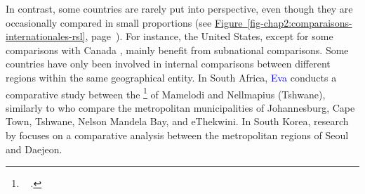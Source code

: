 \begin{refsegment}
In contrast, some countries are rarely put into perspective, even though they are occasionally compared in small proportions (see \hyperref[fig-chap2:comparaisons-internationales-rsl]{Figure~\ref{fig-chap2:comparaisons-internationales-rsl}}, page~\pageref{fig-chap2:comparaisons-internationales-rsl}). For instance, the United States, except for some comparisons with Canada \textcolor{blue}{\autocites[11-16]{ensor_forecasting_2010}[7]{schneider_integration_2005}[83]{pucher_integrating_2009}}, mainly benefit from subnational comparisons. Some countries have only been involved in internal comparisons between different regions within the same geographical entity. In South Africa, \textcolor{blue}{Eva} \textcolor{blue}{\textcite[34]{bechstein_cycling_2010}} conducts a comparative study between the \footnote{~
     \textcolor{blue}{\autocite{geoconfluences_township_2023}}.
} of Mamelodi and Nellmapius (Tshwane), similarly to \textcolor{blue}{\textcite[368]{cooke_relationship_2018}} who compare the metropolitan municipalities of Johannesburg, Cape Town, Tshwane, Nelson Mandela Bay, and eThekwini. In South Korea, research by \textcolor{blue}{\textcite[43, 980]{lee_strategies_2010, lee_bicycle-based_2016}} focuses on a comparative analysis between the metropolitan regions of Seoul and Daejeon.%


\end{refsegment}
